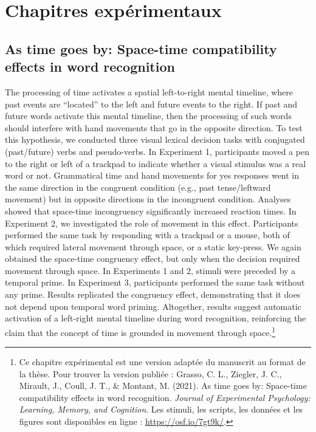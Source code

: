 \documentclass[
  a4paper,12pt,twoside,onecolumn,openright,final,oldfontcommands]{memoir}
\newcommand\chaptercolor{gray}
\newcommand{\changechaptercolor}[1]{
  \renewcommand\chaptercolor{#1}
}
\newcommand{\initial}[1]{
	\lettrine[lines=3,lhang=0.33,nindent=0em]{
		\color{gray}
     		{\textsc{#1}}}{}}
\begin{document}
\hypertarget{part-chapitres-expuxe9rimentaux}{%
\part{Chapitres expérimentaux}\label{part-chapitres-expuxe9rimentaux}}

\changechaptercolor{hokusai3}

\hypertarget{chap3}{%
\chapter{As time goes by: Space-time compatibility effects in word recognition}\label{chap3}}

\initial{T}he processing of time activates a spatial left-to-right mental timeline, where past events are ``located'' to the left and future events to the right. If past and future words activate this mental timeline, then the processing of such words should interfere with hand movements that go in the opposite direction. To test this hypothesis, we conducted three visual lexical decision tasks with conjugated (past/future) verbs and pseudo-verbs. In Experiment 1, participants moved a pen to the right or left of a trackpad to indicate whether a visual stimulus was a real word or not. Grammatical time and hand movements for yes responses went in the same direction in the congruent condition (e.g., past tense/leftward movement) but in opposite directions in the incongruent condition. Analyses showed that space-time incongruency significantly increased reaction times. In Experiment 2, we investigated the role of movement in this effect. Participants performed the same task by responding with a trackpad or a mouse, both of which required lateral movement through space, or a static key-press. We again obtained the space-time congruency effect, but only when the decision required movement through space. In Experiments 1 and 2, stimuli were preceded by a temporal prime. In Experiment 3, participants performed the same task without any prime. Results replicated the congruency effect, demonstrating that it does not depend upon temporal word priming. Altogether, results suggest automatic activation of a left-right mental timeline during word recognition, reinforcing the claim that the concept of time is grounded in movement through space.\footnote{Ce chapitre expérimental est une version adaptée du manuscrit au format de la thèse. Pour trouver la version publiée : Grasso, C. L., Ziegler, J. C., Mirault, J., Coull, J. T., \& Montant, M. (2021). As time goes by: Space-time compatibility effects in word recognition. \emph{Journal of Experimental Psychology: Learning, Memory, and Cognition}. Les stimuli, les scripts, les données et les figures sont disponibles en ligne : \url{https://osf.io/7gt9k/}.}
\end{document}
